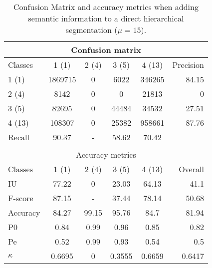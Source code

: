 \begin{table}[H]
\begin{center}
\footnotesize
\begin{tabular}{|l|c|c|c|c|r|}
\hline
\multicolumn{6}{|c|}{Confusion matrix} \\
\hline
 Classes & 1 (1) & 2 (4) & 3 (5) & 4 (13) & Precision \\
\hline
1 (1) & 1869715 & 0 & 6022 & 346265 & 84.15 \\
\hline
2 (4) & 8142 & 0 & 0 & 21813 & 0 \\
\hline
3 (5) & 82695 & 0 & 44484 & 34532 & 27.51 \\
\hline
4 (13) & 108307 & 0 & 25382 & 958661 & 87.76 \\
\hline
Recall & 90.37 & - & 58.62 & 70.42 &  \\
\hline
\multicolumn{6}{c}{ } \\
\hline
\multicolumn{6}{|c|}{Accuracy metrics} \\
\hline
 Classes & 1 (1) & 2 (4) & 3 (5) & 4 (13) & Overall \\
\hline
IU & 77.22 & 0 & 23.03 & 64.13 & 41.1 \\
\hline
F-score & 87.15 & - & 37.44 & 78.14 & 50.68 \\
\hline
Accuracy & 84.27 & 99.15 & 95.76 & 84.7 & 81.94 \\
\hline
P0 & 0.84 & 0.99 & 0.96 & 0.85 & 0.82 \\
\hline
Pe & 0.52 & 0.99 & 0.93 & 0.54 & 0.5 \\
\hline
$\kappa$ & 0.6695 & 0 & 0.3555 & 0.6659 & 0.6417 \\
\hline
\end{tabular}
\caption{Confusion Matrix and accuracy metrics when adding semantic information to a direct hierarchical segmentation ($\mu=15$).}
\label{table:C3_S2_seg_hierar}
\end{center}
\end{table}